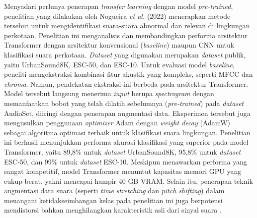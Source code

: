 Menyadari perlunya penerapan \textit{transfer learning} dengan model \textit{pre-trained}, penelitian yang dilakukan oleh Nogueira \textit{et al.} (2022) menerapkan metode tersebut untuk mengidentifikasi suara-suara abnormal dan relevan di lingkungan perkotaan.
Penelitian ini menganalisis dan membandingkan performa arsitektur Transformer dengan arsitektur konvensional (\textit{baseline}) maupun CNN untuk klasifikasi suara perkotaan.
\textit{Dataset} yang digunakan merupakan \textit{dataset} publik, yaitu UrbanSound8K, ESC-50, dan ESC-10.
Untuk evaluasi model \textit{baseline}, peneliti mengekstraksi kombinasi fitur akustik yang kompleks, seperti MFCC dan \textit{chroma}.
Namun, pendekatan ekstraksi ini berbeda pada arsitektur Transformer.
Model tersebut langsung menerima \textit{input} berupa \textit{spectrogram} dengan memanfaatkan bobot yang telah dilatih sebelumnya (\textit{pre-trained}) pada \textit{dataset} AudioSet, diiringi dengan penerapan augmentasi data.
Eksperimen tersebut juga mengusulkan penggunaan \textit{optimizer} Adam dengan \textit{weight decay} (AdamW) sebagai algoritma optimasi terbaik untuk klasifikasi suara lingkungan.
Penelitian ini berhasil menunjukkan performa akurasi klasifikasi yang superior pada model Transformer, yaitu 89,8\% untuk \textit{dataset} UrbanSound8K, 95,8\% untuk \textit{dataset} ESC-50, dan 99\% untuk \textit{dataset} ESC-10.
Meskipun menawarkan performa yang sangat kompetitif, model Transformer menuntut kapasitas memori GPU yang cukup berat, yakni mencapai hampir 40 GB VRAM.
Selain itu, penerapan teknik augmentasi data suara (seperti \textit{time stretching} dan \textit{pitch shifting}) dalam menangani ketidakseimbangan kelas pada penelitian ini juga berpotensi mendistorsi bahkan menghilangkan karakteristik asli dari sinyal suara \cite{nogueira2022transformers}. \par

